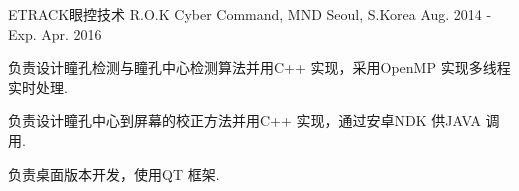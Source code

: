 

\begin{cventries}

  \cventry
    {ETRACK眼控技术} %
    {R.O.K Cyber Command, MND} %
    {Seoul, S.Korea} %
    {Aug. 2014 - Exp. Apr. 2016} %
    {
      \begin{cvitems} %
        \item {负责设计瞳孔检测与瞳孔中心检测算法并用C++ 实现，采用OpenMP 实现多线程实时处理.}
        \item {负责设计瞳孔中心到屏幕的校正方法并用C++ 实现，通过安卓NDK 供JAVA 调用.}
        \item {负责桌面版本开发，使用QT 框架.}
      \end{cvitems}
    }

\end{cventries}

